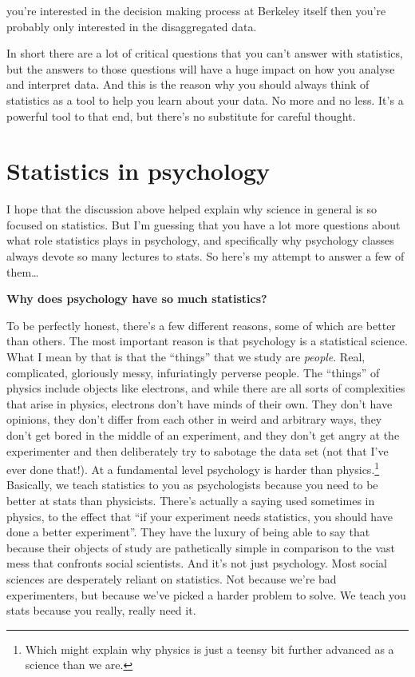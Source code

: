 \documentclass[
]{book}
\begin{document}
you're interested in the decision making process at Berkeley itself then you're probably only interested in the disaggregated data.

In short there are a lot of critical questions that you can't answer with statistics, but the answers to those questions will have a huge impact on how you analyse and interpret data. And this is the reason why you should always think of statistics as a tool to help you learn about your data. No more and no less. It's a powerful tool to that end, but there's no substitute for careful thought.

\hypertarget{statistics-in-psychology}{%
\section{Statistics in psychology}\label{statistics-in-psychology}}

I hope that the discussion above helped explain why science in general is so focused on statistics. But I'm guessing that you have a lot more questions about what role statistics plays in psychology, and specifically why psychology classes always devote so many lectures to stats. So here's my attempt to answer a few of them\ldots{}

\textbf{Why does psychology have so much statistics?}

To be perfectly honest, there's a few different reasons, some of which are better than others. The most important reason is that psychology is a statistical science. What I mean by that is that the ``things'' that we study are \emph{people}. Real, complicated, gloriously messy, infuriatingly perverse people. The ``things'' of physics include objects like electrons, and while there are all sorts of complexities that arise in physics, electrons don't have minds of their own. They don't have opinions, they don't differ from each other in weird and arbitrary ways, they don't get bored in the middle of an experiment, and they don't get angry at the experimenter and then deliberately try to sabotage the data set (not that I've ever done that!). At a fundamental level psychology is harder than physics.\footnote{Which might explain why physics is just a teensy bit further advanced as a science than we are.} Basically, we teach statistics to you as psychologists because you need to be better at stats than physicists. There's actually a saying used sometimes in physics, to the effect that ``if your experiment needs statistics, you should have done a better experiment''. They have the luxury of being able to say that because their objects of study are pathetically simple in comparison to the vast mess that confronts social scientists. And it's not just psychology. Most social sciences are desperately reliant on statistics. Not because we're bad experimenters, but because we've picked a harder problem to solve. We teach you stats because you really, really need it.
\end{document}
